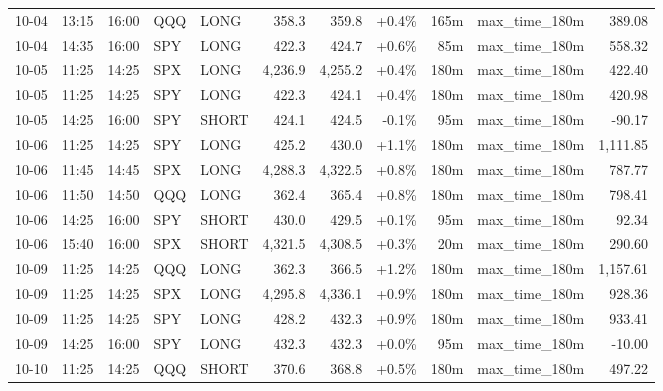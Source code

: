 \documentclass[11pt,a4paper,twoside]{article}
\begin{document}
\begin{center}
\begin{longtable}{>{\color{txtmain}}l l l l l r r r r >{\color{txtmain}}l r}
10-04 & 13:15 & 16:00 & QQQ & LONG & 358.3 & 359.8 & \textcolor{wingreen}{+0.4\%} & 165m & max\_time\_180m & \textcolor{wingreen}{389.08} \\
10-04 & 14:35 & 16:00 & SPY & LONG & 422.3 & 424.7 & \textcolor{wingreen}{+0.6\%} & 85m & max\_time\_180m & \textcolor{wingreen}{558.32} \\
10-05 & 11:25 & 14:25 & SPX & LONG & 4,236.9 & 4,255.2 & \textcolor{wingreen}{+0.4\%} & 180m & max\_time\_180m & \textcolor{wingreen}{422.40} \\
10-05 & 11:25 & 14:25 & SPY & LONG & 422.3 & 424.1 & \textcolor{wingreen}{+0.4\%} & 180m & max\_time\_180m & \textcolor{wingreen}{420.98} \\
10-05 & 14:25 & 16:00 & SPY & SHORT & 424.1 & 424.5 & \textcolor{lossred}{-0.1\%} & 95m & max\_time\_180m & \textcolor{lossred}{-90.17} \\
10-06 & 11:25 & 14:25 & SPY & LONG & 425.2 & 430.0 & \textcolor{wingreen}{+1.1\%} & 180m & max\_time\_180m & \textcolor{wingreen}{1,111.85} \\
10-06 & 11:45 & 14:45 & SPX & LONG & 4,288.3 & 4,322.5 & \textcolor{wingreen}{+0.8\%} & 180m & max\_time\_180m & \textcolor{wingreen}{787.77} \\
10-06 & 11:50 & 14:50 & QQQ & LONG & 362.4 & 365.4 & \textcolor{wingreen}{+0.8\%} & 180m & max\_time\_180m & \textcolor{wingreen}{798.41} \\
10-06 & 14:25 & 16:00 & SPY & SHORT & 430.0 & 429.5 & \textcolor{wingreen}{+0.1\%} & 95m & max\_time\_180m & \textcolor{wingreen}{92.34} \\
10-06 & 15:40 & 16:00 & SPX & SHORT & 4,321.5 & 4,308.5 & \textcolor{wingreen}{+0.3\%} & 20m & max\_time\_180m & \textcolor{wingreen}{290.60} \\
10-09 & 11:25 & 14:25 & QQQ & LONG & 362.3 & 366.5 & \textcolor{wingreen}{+1.2\%} & 180m & max\_time\_180m & \textcolor{wingreen}{1,157.61} \\
10-09 & 11:25 & 14:25 & SPX & LONG & 4,295.8 & 4,336.1 & \textcolor{wingreen}{+0.9\%} & 180m & max\_time\_180m & \textcolor{wingreen}{928.36} \\
10-09 & 11:25 & 14:25 & SPY & LONG & 428.2 & 432.3 & \textcolor{wingreen}{+0.9\%} & 180m & max\_time\_180m & \textcolor{wingreen}{933.41} \\
10-09 & 14:25 & 16:00 & SPY & LONG & 432.3 & 432.3 & \textcolor{wingreen}{+0.0\%} & 95m & max\_time\_180m & \textcolor{lossred}{-10.00} \\
10-10 & 11:25 & 14:25 & QQQ & SHORT & 370.6 & 368.8 & \textcolor{wingreen}{+0.5\%} & 180m & max\_time\_180m & \textcolor{wingreen}{497.22} \\

\end{longtable}
\end{center}
\end{document}
